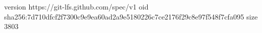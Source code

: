 version https://git-lfs.github.com/spec/v1
oid sha256:7d710dfcf2f7300c9e9ea60ad2a9e5180226c7ce2176f29c8e97f548f7cfa095
size 3803
